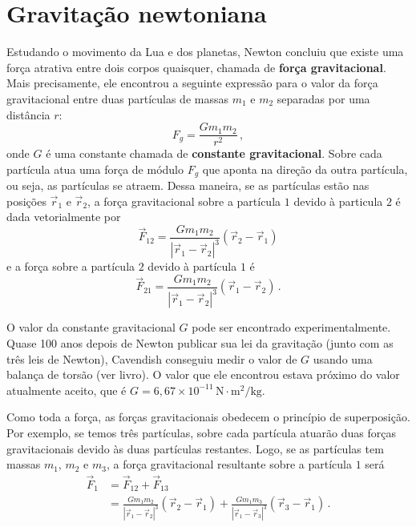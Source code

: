 \documentclass[papersize=a4,DIV=calc,twocolumn=on]{scrartcl}
\theoremstyle{definition}
\begin{document}
\section{Gravitação newtoniana}

Estudando o movimento da Lua e dos planetas, Newton concluiu que
existe uma força atrativa entre dois corpos quaisquer, chamada de
\textbf{força gravitacional}. Mais precisamente, ele encontrou a
seguinte expressão para o valor da força gravitacional entre duas
partículas de massas $m_1$ e $m_2$ separadas por uma distância $r$:
$$F_g=\frac{Gm_1m_2}{r^2}\,,$$
onde $G$ é uma constante chamada de \textbf{constante gravitacional}.
Sobre cada partícula atua uma força de módulo $F_g$ que aponta na
direção da outra partícula, ou seja, as partículas se atraem. Dessa
maneira, se as partículas estão nas posições $\vec r_1$ e $\vec r_2$,
a força gravitacional sobre a partícula $1$ devido à particula $2$ é
dada vetorialmente por
$$\vec F_{12}=\frac{Gm_1m_2}{|\vec r_1-\vec r_2|^3}(\vec r_2-\vec r_1)$$
e a força sobre a partícula $2$ devido à partícula $1$ é
$$\vec F_{21}=\frac{Gm_1m_2}{|\vec r_1-\vec r_2|^3}(\vec r_1-\vec r_2)\,.$$

O valor da constante gravitacional $G$ pode ser encontrado
experimentalmente. Quase 100 anos depois de Newton publicar sua lei da
gravitação (junto com as três leis de Newton), Cavendish conseguiu
medir o valor de $G$ usando uma balança de torsão (ver livro). O valor
que ele encontrou estava próximo do valor atualmente aceito, que é
$G=6{,}67\times 10^{-11}\,\mathrm{N}\cdot\mathrm{m}^2/\mathrm{kg}$.

Como toda a força, as forças gravitacionais obedecem o princípio de
superposição. Por exemplo, se temos três partículas, sobre cada
partícula atuarão duas forças gravitacionais devido às duas partículas
restantes. Logo, se as partículas tem massas $m_1$, $m_2$ e $m_3$, a
força gravitacional resultante sobre a partícula $1$ será
\begin{equation*}
  \begin{split}
    \vec F_1&=\vec F_{12}+\vec F_{13}\\
    &=\frac{Gm_1m_2}{|\vec r_1-\vec r_2|^3}(\vec r_2-\vec
    r_1)+\frac{Gm_1m_3}{|\vec r_1-\vec r_3|^3}(\vec r_3-\vec r_1)\,.
  \end{split}
\end{equation*}
\end{document}
